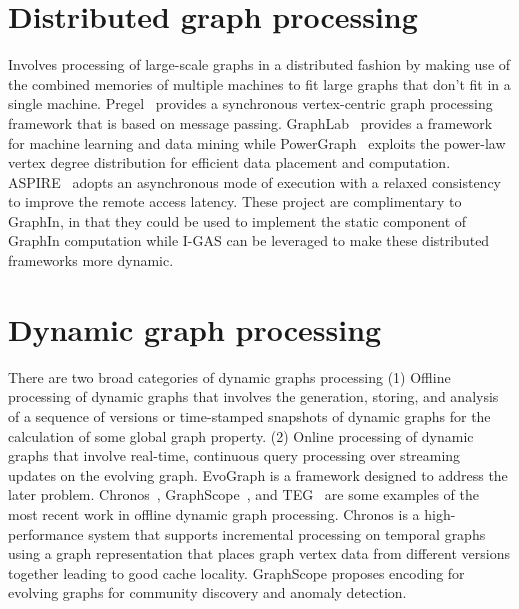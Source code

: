 \section{Distributed graph processing} Involves processing of large-scale graphs in a distributed fashion by making use of the combined memories of multiple machines to fit large graphs that don’t fit in a single machine. Pregel~\cite{pregel} provides a synchronous vertex-centric graph processing framework that is based on message passing. GraphLab~\cite{graphlab} provides a framework for machine learning and data mining while PowerGraph~\cite{powergraph} exploits the power-law vertex degree distribution for efficient data placement and computation. ASPIRE~\cite{aspire} adopts an asynchronous mode of execution with a relaxed consistency to improve the remote access latency. These project are complimentary to GraphIn, in that they could be used to implement the static component of GraphIn  computation while I-GAS can be leveraged to make these distributed frameworks more dynamic. 

\section{Dynamic graph processing} There are two broad categories of dynamic graphs processing (1) Offline processing of dynamic graphs that involves the generation, storing, and analysis of a sequence of versions or time-stamped snapshots of dynamic graphs for the calculation of some global graph property. (2) Online processing of dynamic graphs that  involve real-time, continuous query processing over streaming updates on the evolving graph. EvoGraph is a framework designed to address the later problem.
Chronos~\cite{chronos}, GraphScope~\cite{graphscope}, and TEG~\cite{teg} are some examples of the most recent work in offline dynamic graph processing. Chronos is a high-performance system that supports incremental processing on temporal graphs using a graph representation that places graph vertex data from different versions together leading to good cache locality. GraphScope proposes encoding for evolving graphs for community discovery and anomaly detection. 

